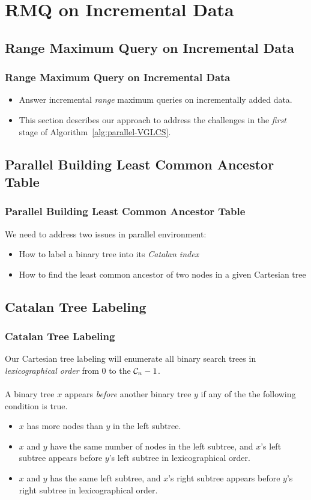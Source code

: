 \section{RMQ on Incremental Data}

\subsection{Range Maximum Query on Incremental Data}
\begin{frame}
    \frametitle{Range Maximum Query on Incremental Data}
    \begin{itemize}
    	\setlength\itemsep{1em}
    	\item
    		Answer incremental {\em range} maximum queries on
			incrementally added data.
    	\item
    		This section describes our approach to address the
			challenges in the {\em first} stage of
			Algorithm~\ref{alg:parallel-VGLCS}.
    \end{itemize}
\end{frame}

\subsection{Parallel Building Least Common Ancestor Table}
\begin{frame}
    \frametitle{Parallel Building Least Common Ancestor Table}
    We need to address two issues in parallel environment:
    \begin{itemize}
    	\setlength\itemsep{1em}
    	\item 
    		How to label a binary tree into its {\em Catalan index}
		\item 
			How to find the least common ancestor of two nodes in a
			given Cartesian tree
	\end{itemize}
\end{frame}

\subsection{Catalan Tree Labeling}
\begin{frame}
    \frametitle{Catalan Tree Labeling}
    Our Cartesian tree labeling will enumerate all binary search trees
	in {\em lexicographical order} from $0$ to the ${\cal C}_n-1$.
	\\~\\
	A binary tree $x$ appears {\em before} another binary tree $y$ if
	any of the the following condition is true.
	\begin{itemize}
		\setlength\itemsep{0.5em}
		\item 
			$x$ has more nodes than $y$ in the left subtree.
		\item 
			$x$ and $y$ have the same number of nodes in the left
  			subtree, and $x$'s left subtree appears before $y$'s left
  			subtree in lexicographical order.
		\item 
			$x$ and $y$ has the same left subtree, and $x$'s right
	  		subtree appears before $y$'s right subtree in
	  		lexicographical order.
	\end{itemize}
\end{frame}

